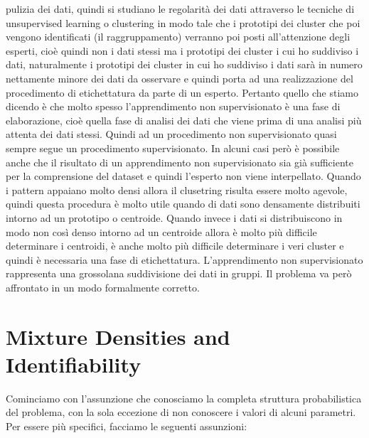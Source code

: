 pulizia dei dati, quindi si studiano le regolarità dei dati attraverso le tecniche di unsupervised learning o clustering in modo tale che i prototipi dei cluster che poi vengono identificati (il raggruppamento) verranno poi posti all'attenzione degli esperti, cioè quindi non i dati stessi ma i prototipi dei cluster i cui ho suddiviso i dati, naturalmente i prototipi dei cluster in cui ho suddiviso i dati sarà in numero nettamente minore dei dati da osservare e quindi porta ad una realizzazione del procedimento di etichettatura da parte di un esperto. Pertanto quello che stiamo dicendo è che molto spesso l'apprendimento non supervisionato è una fase di elaborazione, cioè quella fase di analisi dei dati che viene prima di una analisi più attenta dei dati stessi. Quindi ad un procedimento non supervisionato quasi sempre segue un procedimento supervisionato. In alcuni casi però è possibile anche che il risultato di un apprendimento non supervisionato sia già sufficiente per la comprensione del dataset e quindi l'esperto non viene interpellato. Quando i pattern appaiano molto densi allora il clusetring risulta essere molto agevole, quindi questa procedura è molto utile quando di dati sono densamente distribuiti intorno ad un prototipo o centroide. Quando invece i dati si distribuiscono in modo non così denso intorno ad un centroide allora è molto più difficile determinare i centroidi, è anche molto più difficile determinare i veri cluster e quindi è necessaria una fase di etichettatura. L'apprendimento non supervisionato rappresenta una grossolana suddivisione dei dati in gruppi. Il problema va però affrontato in un modo formalmente corretto.

\section{Mixture Densities and Identifiability}
Cominciamo con l'assunzione che conosciamo la completa struttura probabilistica del problema, con la sola eccezione di non conoscere i valori di alcuni parametri. Per essere più specifici, facciamo le seguenti assunzioni:

